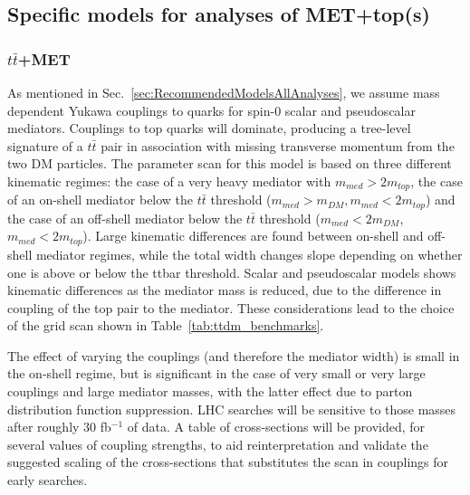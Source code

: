 \documentclass[a4,debug,notitlepage,nobib]{tufte-handout}
\newcommand{\mdm}{\ensuremath{m_{DM}}\xspace}
\newcommand{\mmed}{\ensuremath{m_{med}}\xspace}
\begin{document}
\subsection{Specific models for analyses of MET+top(s)}
\label{sub:SPttbar}

\subsubsection{$t \bar{t}$+MET}

As mentioned in Sec.~\ref{sec:RecommendedModelsAllAnalyses}, we assume 
mass dependent Yukawa couplings to quarks for spin-$0$ scalar
and pseudoscalar mediators. Couplings to top quarks will dominate, 
producing a tree-level signature of a $t \bar{t}$ pair
in association with missing transverse momentum from the two DM particles.
The parameter scan for this model is based on three different kinematic
regimes: the case of a very heavy mediator with $m_{med} > 2 m_{top}$, 
the case of an on-shell mediator below the $t\bar{t}$ threshold
($\mmed >  \mdm, \mmed < 2 m_{top}$) and the case of an off-shell mediator below
the $t\bar{t}$ threshold ($m_{med} < 2 m_{DM}$, $m_{med} < 2 m_{top}$). 
Large kinematic differences are found between on-shell and off-shell mediator
regimes, while the total width changes slope depending on whether one
is above or below the ttbar threshold. 
Scalar and pseudoscalar models shows kinematic differences as the mediator mass 
is reduced, due to the difference in coupling of the top pair to the mediator. 
These considerations lead to the choice of the grid scan shown in 
Table~\ref{tab:ttdm_benchmarks}.

The effect of varying the couplings (and therefore the mediator width) 
is small in the on-shell regime, but is significant in the case of
very small or very large couplings and large mediator masses, 
with the latter effect due to parton distribution function suppression. 
LHC searches will be sensitive to those masses after roughly 30 fb$^{-1}$ of data. 
A table of cross-sections will be provided, for several values of coupling strengths,
to aid reinterpretation and validate the suggested scaling of the cross-sections
that substitutes the scan in couplings for early searches. 
\end{document}
